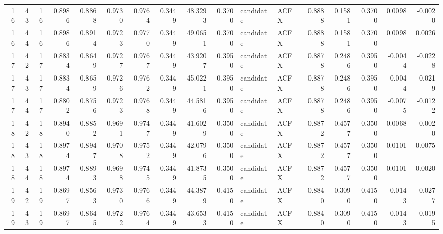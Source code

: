 \begin{tabular}{rrrrrrrrrrllrrrrr}
 16 &    43 &           16 &  0.8986 &   0.8868 &     0.9730 &      0.9764 &           0.3449 &      48.3293 &  0.3700 & candidate &   ACFX &          0.8888 &               0.1581 &                     0.3700 &   0.0098 &   -0.0020 \\
 16 &    44 &           16 &  0.8986 &   0.8914 &     0.9723 &      0.9770 &           0.3449 &      49.0651 &  0.3700 & candidate &   ACFX &          0.8888 &               0.1581 &                     0.3700 &   0.0098 &    0.0026 \\
 17 &    42 &           17 &  0.8834 &   0.8649 &     0.9727 &      0.9767 &           0.3449 &      43.9207 &  0.3950 & candidate &   ACFX &          0.8878 &               0.2486 &                     0.3950 &  -0.0044 &   -0.0228 \\
 17 &    43 &           17 &  0.8834 &   0.8659 &     0.9726 &      0.9762 &           0.3449 &      45.0221 &  0.3950 & candidate &   ACFX &          0.8878 &               0.2486 &                     0.3950 &  -0.0044 &   -0.0219 \\
 17 &    44 &           17 &  0.8802 &   0.8756 &     0.9723 &      0.9768 &           0.3449 &      44.5816 &  0.3950 & candidate &   ACFX &          0.8878 &               0.2486 &                     0.3950 &  -0.0075 &   -0.0122 \\
 18 &    42 &           18 &  0.8940 &   0.8852 &     0.9691 &      0.9747 &           0.3449 &      41.6029 &  0.3500 & candidate &   ACFX &          0.8872 &               0.4577 &                     0.3500 &   0.0068 &   -0.0020 \\
 18 &    43 &           18 &  0.8974 &   0.8947 &     0.9708 &      0.9752 &           0.3449 &      42.0796 &  0.3500 & candidate &   ACFX &          0.8872 &               0.4577 &                     0.3500 &   0.0101 &    0.0075 \\
 18 &    44 &           18 &  0.8974 &   0.8893 &     0.9698 &      0.9745 &           0.3449 &      41.8735 &  0.3500 & candidate &   ACFX &          0.8872 &               0.4577 &                     0.3500 &   0.0101 &    0.0020 \\
 19 &    42 &           19 &  0.8697 &   0.8563 &     0.9730 &      0.9766 &           0.3449 &      44.3879 &  0.4150 & candidate &   ACFX &          0.8840 &               0.3090 &                     0.4150 &  -0.0143 &   -0.0277 \\
 19 &    43 &           19 &  0.8697 &   0.8645 &     0.9722 &      0.9764 &           0.3449 &      43.6533 &  0.4150 & candidate &   ACFX &          0.8840 &               0.3090 &                     0.4150 &  -0.0143 &   -0.0195 \\

\end{tabular}

